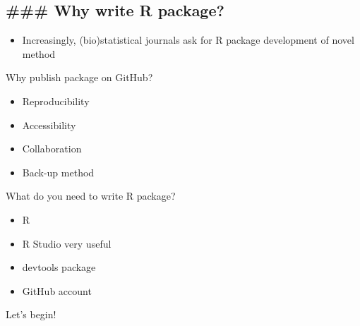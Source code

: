 \documentclass[
  ignorenonframetext,
]{beamer}
\providecommand{\tightlist}{%
  \setlength{\itemsep}{0pt}\setlength{\parskip}{0pt}}
\begin{document}
\hypertarget{why-write-r-package}{%
\subsection{\#\#\# Why write R package?}\label{why-write-r-package}}

\begin{itemize}
\tightlist
\item
  Increasingly, (bio)statistical journals ask for R package development
  of novel method
\end{itemize}

\begin{frame}{Why publish package on GitHub?}
\protect\hypertarget{why-publish-package-on-github}{}

\begin{itemize}
\tightlist
\item
  Reproducibility
\item
  Accessibility
\item
  Collaboration
\item
  Back-up method
\end{itemize}

\end{frame}

\begin{frame}{What do you need to write R package?}
\protect\hypertarget{what-do-you-need-to-write-r-package}{}

\begin{itemize}
\tightlist
\item
  R
\item
  R Studio very useful
\item
  devtools package
\item
  GitHub account
\end{itemize}

\end{frame}

\begin{frame}{Let's begin!}
\protect\hypertarget{lets-begin}{}

\end{frame}
\end{document}
